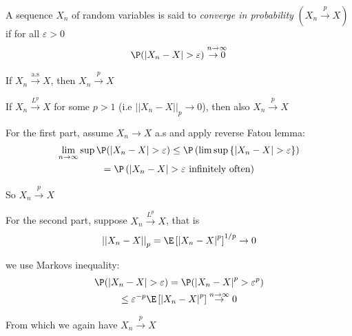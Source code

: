 \par\bigskip
\begin{defo}{}
  A sequence $X_n$ of random variables is said to \textit{converge in probability} $(X_n\stackrel{p}{\to}X)$ if for all $\varepsilon>0$
  \begin{equation*}
    \begin{gathered}
      \P(\left|X_n-X\right|>\varepsilon)\stackrel{n\to\infty}{\to0}
    \end{gathered}
  \end{equation*}
\end{defo}
\par\bigskip
\begin{lem}[]{}
  If $X_n\stackrel{\text{a.s}}{\to}X$, then $X_n\stackrel{p}{\to}X$
  \par\bigskip
  \noindent If $X_n\stackrel{L^p}{\to}X$ for some $p>1$ (i.e $\left|\left|X_n-X\right|\right|_p\to0$), then also $X_n\stackrel{p}{\to} X$
\end{lem}
\par\bigskip
\begin{prf}[]{}
  For the first part, assume $X_n\to X$ a.s and apply reverse Fatou lemma:
  \begin{equation*}
    \begin{gathered}
    \lim_{n\to\infty}\sup\P(\left|X_n-X\right|>\varepsilon)\leq\P\left(\lim\sup\left\{\left|X_n-X\right|>\varepsilon\right\}\right)\\
    = \P\left(\left|X_n-X\right|>\varepsilon\text{ infinitely often}\right)\\
    \end{gathered}
  \end{equation*}\par
  \noindent So $X_n\stackrel{p}{\to} X$
  \par\bigskip
  \noindent For the second part, suppose $X_n\stackrel{L^p}{\to}X$, that is 
  \begin{equation*}
    \begin{gathered}
      \left|\left|X_n-X\right|\right|_p = \E\left[\left|X_n-X\right|^p\right]^{1/p}\to0
    \end{gathered}
  \end{equation*}\par
  \noindent we use Markovs inequality:
  \begin{equation*}
    \begin{gathered}
      \P(\left|X_n-X\right|>\varepsilon) = \P(\left|X_n-X\right|^p>\varepsilon^p)\\
      \leq\varepsilon^{-p}\E\left[\left|X_n-X\right|^p\right]\stackrel{n\to\infty}{\to}0
    \end{gathered}
  \end{equation*}\par
  \noindent From which we again have $X_n\stackrel{p}{\to}X$
\end{prf}
